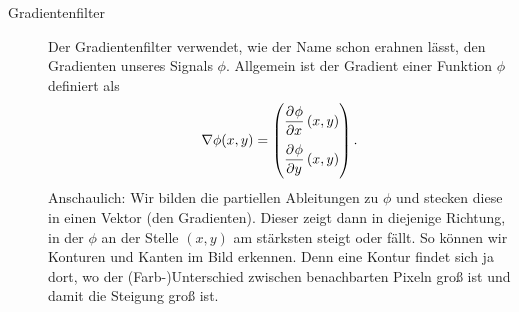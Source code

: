 \begin{example}
\begin{description}
\begin{figure}[ht]
  \label{fig:binom}
  \end{figure}
\item [Gradientenfilter]
  Der Gradientenfilter verwendet, wie der Name schon erahnen lässt, den Gradienten unseres
  Signals $ \phi $. Allgemein ist der Gradient einer Funktion $ \phi $ definiert als
  \[
    \nabla \phi(x,y) = \begin{pmatrix}
    \dpd{\phi}{x}(x,y) \\[1em]
    \dpd{\phi}{y}(x,y)
    \end{pmatrix}.
  \]
  Anschaulich: Wir bilden die partiellen Ableitungen zu $ \phi $ und stecken diese in einen Vektor 
  (den Gradienten). Dieser zeigt dann in diejenige Richtung, in der $ \phi $ an der Stelle $ (x,y) $
  am stärksten steigt oder fällt. So können wir Konturen und Kanten im Bild erkennen. Denn eine 
  Kontur findet sich ja dort, wo der (Farb-)Unterschied zwischen benachbarten Pixeln groß ist und
  damit die Steigung groß ist.
  

\end{description}
\end{example}
